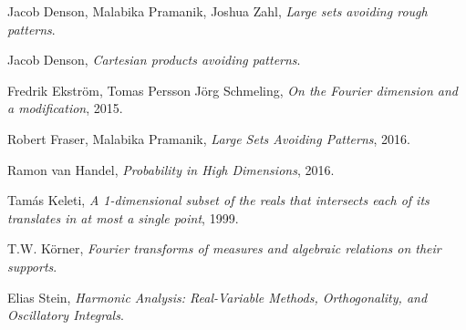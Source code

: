 \documentclass[dvipsnames,letterpaper,12pt]{article}
\numberwithin{equation}{section}
\numberwithin{theorem}{section}
\begin{document}
\begin{comment}
so this causes us no problems since we only care about whether $A$ is differentiable except at finitely many points. To analyze $A(x_0)$ when $f'(x_0) = 0$, we note that a solution that gives the maximum either satisfies
%
\[ f'(x)(f'(x)^2 + 1) + (x - x_0) f''(x) = 0 \]
%
or
%
\[ x - x_0 = \frac{\varepsilon f'(x)}{\sqrt{1 + f'(x)^2}} \]
%
or
%
\[ x - x_0 = \frac{-\varepsilon f'(x)}{\sqrt{1 + f'(x)^2}}. \]
%
If $\varepsilon$ is small enough, then the implicit function theorem implies that the second and third equations have finitely many solutions for each $x_0$, which are locally smoothly parameterized. Since $f'(x_0) \neq 0$, the first equation does not even have any solutions if $\varepsilon \lesssim 1$. Thus we conclude that if $\varepsilon$ is small enough, there exists a function $x(x_0)$ which is smooth, except at finitely many points, such that
%
\[ g(x_0) = f(x) + \frac{x - x_0}{f'(x)}. \]
%
Thus at any $x_0$ where $x$ is smooth, we conclude
%
\[ g'(x_0) = f'(x) \cdot x' + \frac{x' - 1}{f'(x)} - \frac{x - x_0}{f'(x)^2} f''(x) x'. \]

\end{comment}

\begin{thebibliography}{9}

    Jacob Denson, Malabika Pramanik, Joshua Zahl,
    \textit{Large sets avoiding rough patterns}.

    Jacob Denson,
    \textit{Cartesian products avoiding patterns}.

    Fredrik Ekstr\"{o}m, Tomas Persson J\"{o}rg Schmeling,
    \textit{On the {F}ourier dimension and a modification},
    2015.

    Robert Fraser, Malabika Pramanik,
    \textit{Large Sets Avoiding Patterns},
    2016.


    Ramon van Handel,
    \textit{Probability in High Dimensions},
    2016.

    Tam\'{a}s Keleti,
    \textit{A 1-dimensional subset of the reals that intersects each of its translates in at most a single point},
    1999.


    T.W. K\"{o}rner,
    \textit{{F}ourier transforms of measures and algebraic relations on their supports}.

    Elias Stein,
    \textit{Harmonic Analysis: Real-Variable Methods, Orthogonality, and Oscillatory Integrals}.


\end{thebibliography}
\end{document}
